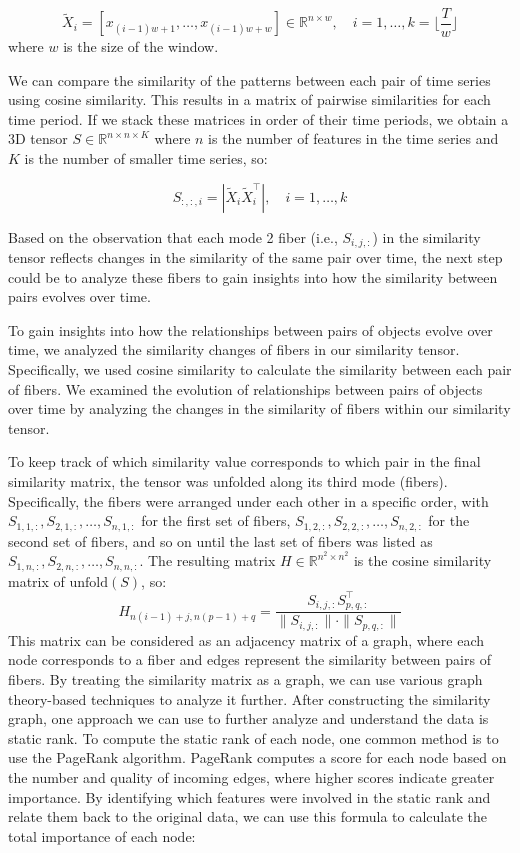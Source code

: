 \documentclass[twoside,11pt]{article}
\begin{document}
\[
  \tilde{X}_i = [x_{(i-1)w + 1}, \ldots, x_{(i-1)w + w}] \in \mathbb{R}^{n \times w}, \quad i = 1, \ldots, k = \lfloor \frac{T}{w}   \rfloor
\]
where \( w \) is the size of the window.

We can compare the similarity of the patterns between each pair of time series using cosine similarity. This results in a matrix of pairwise similarities for each time period. If we stack these matrices in order of their time periods, we obtain a 3D tensor
\(
S \in \mathbb{R}^{n \times n \times K}
\)
where \( n \) is the number of features in the time series and \( K \) is the number of smaller time series, so:

\[
  S_{:,:,i} = |\tilde{X}_i \tilde{X}_i^\top|, \quad i = 1, \ldots, k
\]

Based on the observation that each mode 2 fiber (i.e., \( S_{i,j,:} \)) in the similarity tensor reflects changes in the similarity of the same pair over time, the next step could be to analyze these fibers to gain insights into how the similarity between pairs evolves over time.

To gain insights into how the relationships between pairs of objects evolve over time, we analyzed the similarity changes of fibers in our similarity tensor. Specifically, we used cosine similarity to calculate the similarity between each pair of fibers. We examined the evolution of relationships between pairs of objects over time by analyzing the changes in the similarity of fibers within our similarity tensor.


To keep track of which similarity value corresponds to which pair in the final similarity matrix, the tensor was unfolded along its third mode (fibers). Specifically, the fibers were arranged under each other in a specific order, with
\(
S_{1,1,:}, S_{2,1,:}, \ldots, S_{n,1,:}
\)
for the first set of fibers,
\(
S_{1,2,:}, S_{2,2,:}, \ldots, S_{n,2,:}
\)
for the second set of fibers, and so on until the last set of fibers was listed as
\(
S_{1,n,:}, S_{2,n,:}, \ldots, S_{n,n,:}.
\)
The resulting matrix
\(
H \in \mathbb{R}^{n^2 \times n^2}
\)
is the cosine similarity matrix of \(\text{unfold}(S)\), so:
\[
  H_{n(i-1) + j, n(p-1) + q} = \frac{S_{i,j,:} S_{p,q,:}^\top}{\| S_{i,j,:} \| \cdot \| S_{p,q,:} \|}
\]
This matrix can be considered as an adjacency matrix of a graph, where each node
corresponds to a fiber and edges represent the similarity between pairs of fibers. By treating
the similarity matrix as a graph, we can use various graph theory-based techniques to
analyze it further.
After constructing the similarity graph, one approach we can use to further analyze and
understand the data is static rank. To compute the static rank of each node, one common
method is to use the PageRank algorithm. PageRank computes a score for each node
based on the number and quality of incoming edges, where higher scores indicate greater
importance.
By identifying which features were involved in the static rank and relate them back to
the original data, we can use this formula to calculate the total importance of each node:
\end{document}
